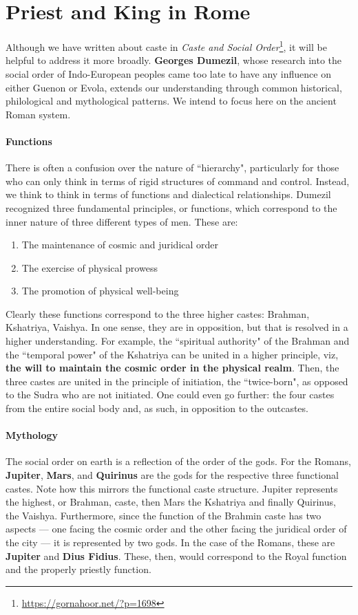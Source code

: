 \section{Priest and King in Rome}

Although we have written about caste in \textit{Caste and Social Order}\footnote{\url{https://gornahoor.net/?p=1698}}, it will be helpful to address it more broadly. \textbf{Georges Dumezil}, whose research into the social order of Indo-European peoples came too late to have any influence on either Guenon or Evola, extends our understanding through common historical, philological and mythological patterns. We intend to focus here on the ancient Roman system.

\paragraph{Functions}
There is often a confusion over the nature of ``hierarchy", particularly for those who can only think in terms of rigid structures of command and control. Instead, we think to think in terms of functions and dialectical relationships. Dumezil recognized three fundamental principles, or functions, which correspond to the inner nature of three different types of men. These are:

\begin{enumerate}
\item The maintenance of cosmic and juridical order 
\item The exercise of physical prowess 
\item The promotion of physical well-being 
\end{enumerate}
Clearly these functions correspond to the three higher castes: Brahman, Kshatriya, Vaishya. In one sense, they are in opposition, but that is resolved in a higher understanding. For example, the ``spiritual authority" of the Brahman and the ``temporal power" of the Kshatriya can be united in a higher principle, viz, \textbf{the will to maintain the cosmic order in the physical realm}. Then, the three castes are united in the principle of initiation, the ``twice-born", as opposed to the Sudra who are not initiated. One could even go further: the four castes from the entire social body and, as such, in opposition to the outcastes.

\paragraph{Mythology}
The social order on earth is a reflection of the order of the gods. For the Romans, \textbf{Jupiter}, \textbf{Mars}, and \textbf{Quirinus }are the gods for the respective three functional castes. Note how this mirrors the functional caste structure. Jupiter represents the highest, or Brahman, caste, then Mars the Kshatriya and finally Quirinus, the Vaishya. Furthermore, since the function of the Brahmin caste has two aspects — one facing the cosmic order and the other facing the juridical order of the city — it is represented by two gods. In the case of the Romans, these are \textbf{Jupiter} and \textbf{Dius Fidius}. These, then, would correspond to the Royal function and the properly priestly function.

